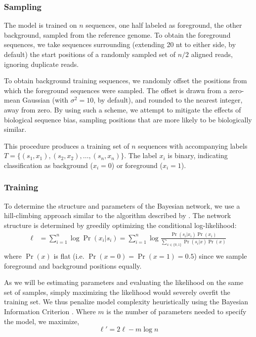 \documentclass{bioinfo}
\begin{document}
\subsubsection{Sampling}

The model is trained on $n$ sequences, one half labeled as foreground, the other
background, sampled from the reference genome. To obtain the foreground
sequences, we take sequences surrounding (extending 20 nt to either side, by
default) the start positions of a randomly sampled set of $n/2$ aligned reads,
ignoring duplicate reads.

To obtain background training sequences, we randomly offset the positions from
which the foreground sequences were sampled.  The offset is drawn from a
zero-mean Gaussian (with $\sigma^2 = 10$, by default), and rounded to the
nearest integer, away from zero.  By using such a scheme, we attempt to mitigate
the effects of biological sequence bias, sampling positions that are more likely
to be biologically similar.

This procedure produces a training set of $n$ sequences with accompanying labels
$T = \{ (s_1, x_1), (s_2, x_2), \dots, (s_n, x_n) \}$. The label $x_i$ is
binary, indicating classification as background ($x_i = 0$) or foreground ($x_i
= 1$).

\subsubsection{Training}


To determine the structure and parameters of the Bayesian network, we use a
hill-climbing approach similar to the algorithm described by \citet{Grossman2004}.
The network structure is determined by greedily optimizing the conditional
log-likelihood:
\begin{align*}
\ell &= \sum_{i=1}^{n} \log \Pr( x_i | s_i ) 
=
\sum_{i=1}^{n} \log \frac{ \Pr(s_i | x_i) \Pr( x_i ) }{
\sum_{x \in \{0,1\}} \Pr( s_i | x ) \Pr(x) } \\
\end{align*}
where $\Pr(x)$ is flat (i.e.  $\Pr( x = 0 ) = \Pr( x = 1 ) =
0.5$) since we sample foreground and background positions equally.

As we will be estimating parameters and evaluating the likelihood on the same
set of samples, simply maximizing the likelihood would severely overfit the
training set. We thus penalize model complexity heuristically using the Bayesian
Information Criterion \citep{Schwarz1978a}. Where $m$ is the number of
parameters needed to specify the model, we maximize, 
$$ \ell' = 2 \ell - m \log n $$
\end{document}
